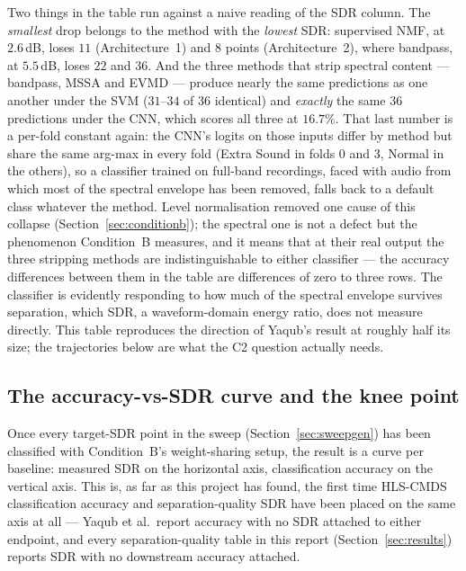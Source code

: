 \documentclass[11pt]{article}
\begin{document}
Two things in the table run against a naive reading of the SDR column.
The \emph{smallest} drop belongs to the method with the \emph{lowest}
SDR: supervised NMF, at $2.6$\,dB, loses $11$ (Architecture~1) and $8$
points (Architecture~2), where bandpass, at $5.5$\,dB, loses $22$ and
$36$. And the three methods that strip spectral content --- bandpass, MSSA
and EVMD --- produce nearly the same predictions as one another under the
SVM ($31$--$34$ of 36 identical) and \emph{exactly} the same 36
predictions under the CNN, which scores all three at $16.7\%$. That last
number is a per-fold constant again: the CNN's logits on those inputs
differ by method but share the same arg-max in every fold (Extra Sound in
folds 0 and 3, Normal in the others), so a classifier trained on
full-band recordings, faced with audio from which most of the spectral
envelope has been removed, falls back to a default class whatever the
method. Level normalisation removed one cause of this collapse
(Section~\ref{sec:conditionb}); the spectral one is not a defect but the
phenomenon Condition~B measures, and it means that at their real output
the three stripping methods are indistinguishable to either classifier
--- the accuracy differences between them in the table are differences of
zero to three rows. The classifier is evidently responding to how much
of the spectral envelope survives separation, which SDR, a
waveform-domain energy ratio, does not measure directly. This table
reproduces the direction of Yaqub's result at roughly half its size; the
trajectories below are what the C2 question actually needs.

\subsection{The accuracy-vs-SDR curve and the knee point}
\label{sec:knee}

Once every target-SDR point in the sweep (Section~\ref{sec:sweepgen}) has
been classified with Condition~B's weight-sharing setup, the result is a
curve per baseline: measured SDR on the horizontal axis, classification
accuracy on the vertical axis. This is, as far as this project has found,
the first time HLS-CMDS classification accuracy and separation-quality SDR
have been placed on the same axis at all --- Yaqub et al.\ report accuracy
with no SDR attached to either endpoint, and every separation-quality
table in this report (Section~\ref{sec:results}) reports SDR with no
downstream accuracy attached.
\end{document}
